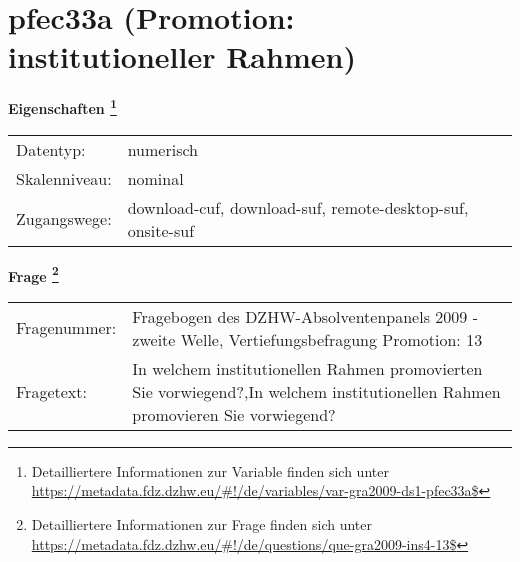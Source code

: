 
    \setcounter{footnote}{0}

    \vspace*{-1.8cm}
	\section{pfec33a (Promotion: institutioneller Rahmen)}
	\label{section:pfec33a}



    \vspace*{0.5cm}
    \noindent\textbf{Eigenschaften
	\footnote{Detailliertere Informationen zur Variable finden sich unter
		\url{https://metadata.fdz.dzhw.eu/\#!/de/variables/var-gra2009-ds1-pfec33a$}}}\\
	\begin{tabularx}{\hsize}{@{}lX}
	Datentyp: & numerisch \\
	Skalenniveau: & nominal \\
	Zugangswege: &
	  download-cuf, 
	  download-suf, 
	  remote-desktop-suf, 
	  onsite-suf
 \\
    \end{tabularx}



				\vspace*{0.5cm}
                \noindent\textbf{Frage
	                \footnote{Detailliertere Informationen zur Frage finden sich unter
		              \url{https://metadata.fdz.dzhw.eu/\#!/de/questions/que-gra2009-ins4-13$}}}\\
				\begin{tabularx}{\hsize}{@{}lX}
					Fragenummer: &
					  Fragebogen des DZHW-Absolventenpanels 2009 - zweite Welle, Vertiefungsbefragung Promotion:
					  13
 \\
					Fragetext: & In welchem institutionellen Rahmen promovierten Sie vorwiegend?,In welchem institutionellen Rahmen promovieren Sie vorwiegend? \\
				\end{tabularx}






